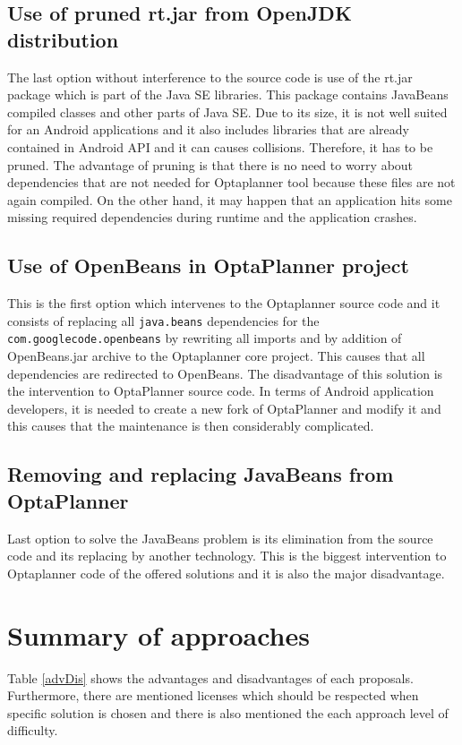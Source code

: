 \subsection{Use of pruned rt.jar from OpenJDK distribution}
The last option without interference to the source code is use of the rt.jar package which is part of the Java SE libraries. This package contains JavaBeans compiled classes and other parts of Java SE. Due to its size, it is not well suited for an Android applications and it also includes libraries that are already contained in Android API and it can causes collisions. Therefore, it has to be pruned. The advantage of pruning is that there is no need to worry about dependencies that are not needed for Optaplanner tool because these files are not again compiled. On the other hand, it may happen that an application hits some missing required dependencies during runtime and the application crashes.

\subsection{Use of OpenBeans in OptaPlanner project}
This is the first option which intervenes to the Optaplanner source code and it consists of replacing all \texttt{java.beans} dependencies for the \texttt{com.googlecode.openbeans} by rewriting all imports and by addition of OpenBeans.jar archive to the Optaplanner core project. This causes that all dependencies are redirected to OpenBeans. The disadvantage of this solution is the intervention to OptaPlanner source code. In terms of Android application developers, it is needed to create a new fork of OptaPlanner and modify it and this causes that the maintenance is then considerably complicated.

\subsection{Removing and replacing JavaBeans from OptaPlanner}
Last option to solve the JavaBeans problem is its elimination from the source code and its replacing by another technology. This is the biggest intervention to Optaplanner code of the offered solutions and it is also the major disadvantage.

\section{Summary of approaches}\label{summary}
Table \ref{advDis} shows the advantages and disadvantages of each proposals. Furthermore, there are mentioned licenses which should be respected when specific solution is chosen and there is also mentioned the each approach level of difficulty.

